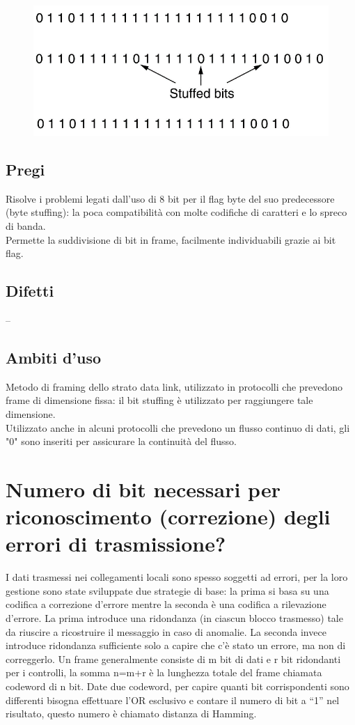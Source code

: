 \begin{figure}[H]
\centering
\includegraphics[scale=0.8]{res/img/14_BitStuffing.png}
\end{figure}

\subsection{Pregi}
Risolve i problemi legati dall'uso di 8 bit per il flag byte del suo predecessore (byte stuffing): la poca compatibilità con molte codifiche di caratteri e lo spreco di banda.\\
Permette la suddivisione di bit in frame, facilmente individuabili grazie ai bit flag.

\subsection{Difetti}
--
\subsection{Ambiti d'uso}
Metodo di framing dello strato data link, utilizzato in protocolli che prevedono frame di dimensione fissa: il bit stuffing è utilizzato per raggiungere tale dimensione.\\
Utilizzato anche in alcuni protocolli che prevedono un flusso continuo di dati, gli "0" sono inseriti per assicurare la continuità del flusso.

\section{Numero di bit necessari per riconoscimento (correzione) degli errori di trasmissione?}

I dati trasmessi nei collegamenti locali sono spesso soggetti ad errori, per la loro gestione sono state sviluppate due strategie di base: la prima si basa su una codifica a correzione d'errore mentre la seconda è una codifica a rilevazione d'errore.
La prima introduce una ridondanza (in ciascun blocco trasmesso) tale da riuscire a ricostruire il messaggio in caso di anomalie. La seconda invece introduce ridondanza sufficiente solo a capire che c'è stato un errore, ma non di correggerlo.
Un frame generalmente consiste di m bit di dati e r bit ridondanti per i controlli, la somma n=m+r è la lunghezza totale del frame chiamata codeword di n bit. Date due codeword, per capire quanti bit corrispondenti sono differenti bisogna effettuare l'OR esclusivo e contare il numero di bit a “1” nel risultato, questo numero è chiamato distanza di Hamming.
